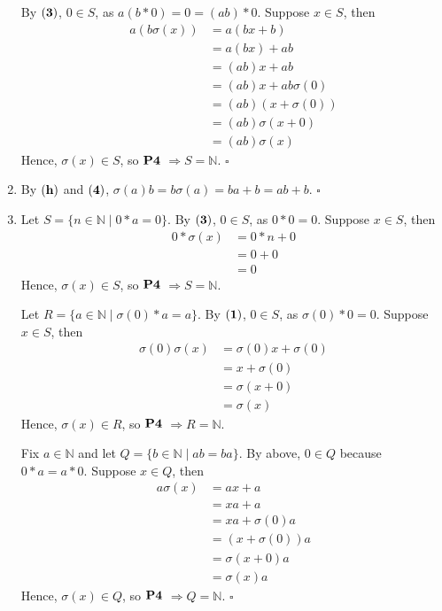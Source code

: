 \documentclass{article}
\begin{document}
\begin{enumerate}[label=\textbf{(\alph*)}]
{	By $\bf{(3)}$, $0 \in S$, as
	$a(b*0)=0=(ab)*0$.
	Suppose $x \in S$, then
	\begin{align*}
		a(b\sigma(x)) &= a(bx+b) 		\tag{4}\\
			&= a(bx) + ab				\tag{h,e}\\
			&= (ab)x + ab				\tag{IH}\\
			&= (ab)x + ab\sigma(0)		\tag{h}\\
			&= (ab)(x+\sigma(0))		\tag{e}\\
			&= (ab)\sigma(x+0)			\tag{2}\\
			&= (ab)\sigma(x)			\tag{1}
	\end{align*}
	Hence, $\sigma(x) \in S$, so $\bf{P4}$
	$\Rightarrow S = \mathbb{N}$.
	\hfill $\square$
}
\item{
	By $\bf{(h)}$ and $\bf{(4)}$,
	$\sigma(a)b=b\sigma(a)=ba+b=ab+b$.
	\hfill $\square$
}
\item{
	Let $S=\{n\in\mathbb{N}\mid0*a=0\}$.
	By $\bf{(3)}$, $0 \in S$, as
	$0*0=0$.
	Suppose $x\in S$, then
	\begin{align*}
		0*\sigma(x) &= 0*n + 0	\tag{4} \\
			&= 0 + 0			\tag{IH}\\
			&= 0				\tag{1}
	\end{align*}
	Hence, $\sigma(x) \in S$, so $\bf{P4}$
	$\Rightarrow S = \mathbb{N}$.

	Let $R=\{a\in\mathbb{N}\mid \sigma(0)*a=a\}$.
	By $\bf{(1)}$, $0 \in S$, as
	$\sigma(0)*0=0$.
	Suppose $x \in S$, then
	\begin{align*}
		\sigma(0)\sigma(x) &= \sigma(0)x+\sigma(0)	\tag{4}\\
			&= x + \sigma(0)		\tag{IH}\\
			&= \sigma(x+0)			\tag{2} \\
			&= \sigma(x)			\tag{1}
	\end{align*}
	Hence, $\sigma(x) \in R$, so $\bf{P4}$
	$\Rightarrow R = \mathbb{N}$.
	
	Fix $a\in\mathbb{N}$ and let
	$Q=\{b\in\mathbb{N}\mid ab=ba\}$.
	By above, $0 \in Q$ because $0*a=a*0$.
	Suppose $x\in Q$, then
	\begin{align*}
		a\sigma(x) &= ax+a		\tag{4} \\
			&= xa+a				\tag{IH}\\
			&= xa+\sigma(0)a	\tag{above}\\
			&= (x+\sigma(0))a	\tag{e}\\
			&= \sigma(x+0)a		\tag{2}\\
			&= \sigma(x)a		\tag{1}
	\end{align*}
	Hence, $\sigma(x) \in Q$, so $\bf{P4}$
	$\Rightarrow Q = \mathbb{N}$.
	\hfill $\square$
}
\end{enumerate} 
  
\end{document}
